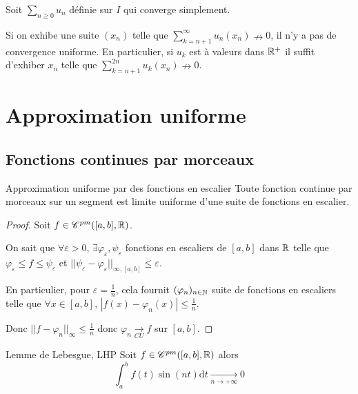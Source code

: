 \begin{proposition}{}{}
    Soit $\sum_{n \geqslant 0} u_n$ définie sur $I$ qui converge simplement. 

    Si on exhibe une suite $(x_n)$ telle que $\displaystyle \sum_{k = n + 1 }^{\infty  } u_n(x_n) \nrightarrow 0$,
    il n'y a pas de convergence uniforme. En particulier, si $u_k$ est à valeurs dans $\mathbb{R}^+$ il suffit 
    d'exhiber $x_n$ telle que $\displaystyle \sum_{k = n + 1}^{2n} u_k(x_n) \nrightarrow 0$.
\end{proposition}


\section{Approximation uniforme }
\subsection{Fonctions continues par morceaux }

\begin{theorement}{Approximation uniforme par des fonctions en escalier}{}
    Toute fonction continue par morceaux sur un segment est limite uniforme d'une suite 
    de fonctions en escalier. 
\end{theorement}

\begin{proof}
    Soit $f \in \mathscr C^{pm}([a, b], \mathbb{R})$. 

    On sait que $\forall \varepsilon > 0, \, \exists \varphi_\varepsilon, \psi_\varepsilon$ fonctions en escaliers 
    de $[a, b]$ dans $\mathbb{R}$ telle que $\varphi_\varepsilon \leqslant f \leqslant \psi_\varepsilon$ et
    $||\psi_\varepsilon - \varphi_\varepsilon||_{\infty, [a, b]} \leqslant \varepsilon$.

    En particulier, pour $\varepsilon = \frac 1 n$, cela fournit $(\varphi_n)_{n \in \mathbb{N}}$ suite de 
    fonctions en escaliers telle que $\forall x \in [a, b], \, | f(x) - \varphi_n(x) | \leqslant \frac 1 n$.

    Donc $||f - \varphi_n||_\infty \leqslant \frac 1 n $ donc $\varphi_n \xrightarrow[CU]{} f$ sur $[a, b]$.
\end{proof}


\begin{proposition}{Lemme de Lebesgue, LHP}{}
    Soit $f \in \mathscr C^{pm}([a, b], \mathbb{R})$ alors 
    $$\int_a^b f(t) \sin(nt) \mathrm d t \xrightarrow[n \to + \infty ]{} 0$$
\end{proposition}

